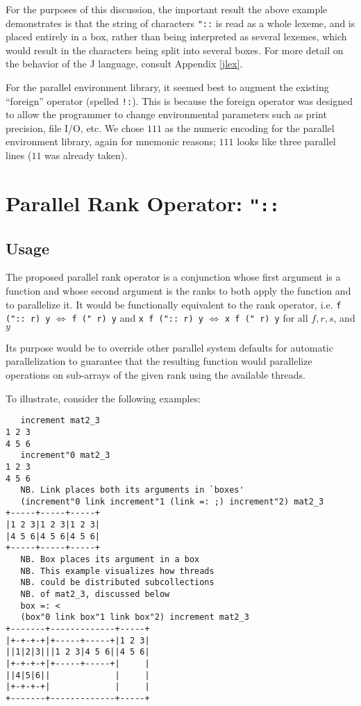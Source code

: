 For the purposes of this discussion, the important result the above example demonstrates 
is that the string of characters \texttt{"::} is read as a whole lexeme, and is placed entirely in a box, 
rather than being interpreted as several lexemes, 
which would result in the characters being split into several boxes.
For more detail on the behavior of the J language, consult Appendix \ref{jlex}. %

For the parallel environment library, 
it seemed best to augment the existing ``foreign'' operator (spelled \texttt{!:}).
This is because the foreign operator was designed to 
allow the programmer to change environmental parameters 
such as print precision, file I/O, etc\cite{jvocab}. 
We chose $111$ as the numeric encoding for the parallel environment library, again for mnemonic reasons; 
$111$ looks like three parallel lines ($11$ was already taken).

\section{Parallel Rank Operator: \texttt{"::}}
\label{prank}

\subsection{Usage}
The proposed parallel rank operator is a conjunction 
whose first argument is a function 
and whose second argument is the ranks to both apply the function and to parallelize it. 
It would be functionally equivalent to the rank operator, i.e. 
\texttt{f (":: r) y} $\Leftrightarrow$ \texttt{f (" r) y} and
\texttt{x f (":: r) y} $\Leftrightarrow$ \texttt{x f (" r) y}
for all $f, r, s$, and $y$

Its purpose would be to override other parallel system defaults for automatic parallelization
to guarantee that the resulting function would parallelize operations on sub-arrays of the given rank 
using the available threads.

To illustrate, consider the following examples:

\begin{singlespacing}
\begin{small}
\begin{verbatim}
   increment mat2_3
1 2 3
4 5 6
   increment"0 mat2_3
1 2 3
4 5 6
   NB. Link places both its arguments in `boxes'
   (increment"0 link increment"1 (link =: ;) increment"2) mat2_3
+-----+-----+-----+
|1 2 3|1 2 3|1 2 3|
|4 5 6|4 5 6|4 5 6|
+-----+-----+-----+
   NB. Box places its argument in a box
   NB. This example visualizes how threads
   NB. could be distributed subcollections
   NB. of mat2_3, discussed below
   box =: <
   (box"0 link box"1 link box"2) increment mat2_3
+-------+-------------+-----+
|+-+-+-+|+-----+-----+|1 2 3|
||1|2|3|||1 2 3|4 5 6||4 5 6|
|+-+-+-+|+-----+-----+|     |
||4|5|6||             |     |
|+-+-+-+|             |     |
+-------+-------------+-----+
\end{verbatim}
\end{small}
\end{singlespacing}

